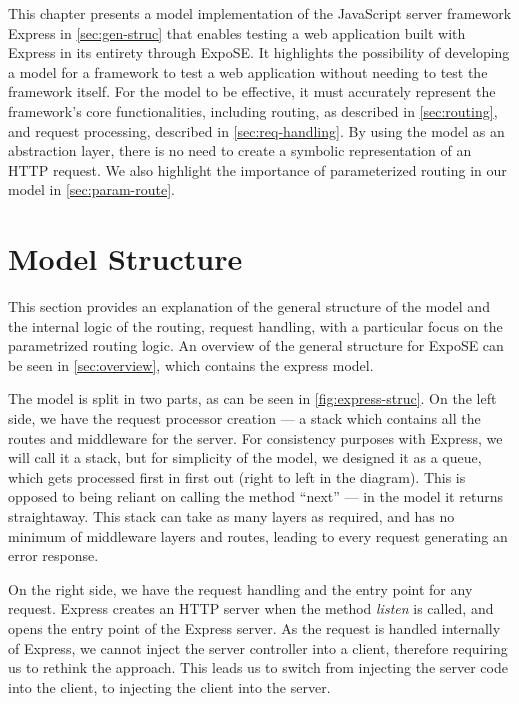 \raggedbottom
This chapter presents a model implementation of the JavaScript server framework Express in \autoref{sec:gen-struc} that enables testing a web application built with Express in its entirety through ExpoSE. It highlights the possibility of developing a model for a framework to test a web application without needing to test the framework itself. For the model to be effective, it must accurately represent the framework's core functionalities, including routing, as described in \autoref{sec:routing}, and request processing, described in \autoref{sec:req-handling}. By using the model as an abstraction layer, there is no need to create a symbolic representation of an HTTP request. We also highlight the importance of parameterized routing in our model in \autoref{sec:param-route}.

\section{Model Structure}
\label{sec:gen-struc}

This section provides an explanation of the general structure of the model and the internal logic of the routing, request handling, with a particular focus on the parametrized routing logic. An overview of the general structure for ExpoSE can be seen in \autoref{sec:overview}, which contains the express model.

The model is split in two parts, as can be seen in \autoref{fig:express-struc}. On the left side, we have the request processor creation — a stack which contains all the routes and middleware for the server. For consistency purposes with Express, we will call it a stack, but for simplicity of the model, we designed it as a queue, which gets processed first in first out (right to left in the diagram). This is opposed to being reliant on calling the method “next” — in the model it returns straightaway. 
This stack can take as many layers as required, and has no minimum of middleware layers and routes, leading to every request generating an error response. 



On the right side, we have the request handling and the entry point for any request. 
Express creates an HTTP server when the method \textit{listen} is called, and opens the entry point of the Express server. As the request is handled internally of Express, we cannot inject the server controller into a client, therefore requiring us to rethink the approach. This leads us to switch from injecting the server code into the client, to injecting the client into the server. 

